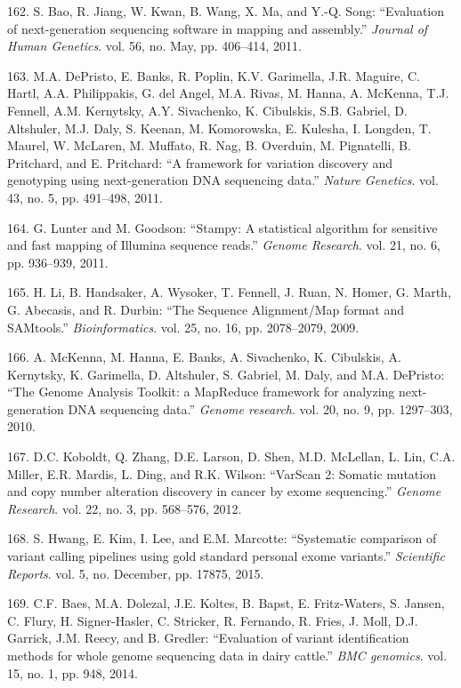 \documentclass[12pt,a4paper,twoside]{ugathesis}
\theoremstyle{definition}
\theoremstyle{definition}
\theoremstyle{definition}
\theoremstyle{remark}
\begin{document}
\hypertarget{ref-Bao2011}{}
162. S. Bao, R. Jiang, W. Kwan, B. Wang, X. Ma, and Y.-Q. Song:
``Evaluation of next-generation sequencing software in mapping and
assembly.'' \emph{Journal of Human Genetics}. vol. 56, no. May, pp.
406--414, 2011.

\hypertarget{ref-DePristo2011}{}
163. M.A. DePristo, E. Banks, R. Poplin, K.V. Garimella, J.R. Maguire,
C. Hartl, A.A. Philippakis, G. del Angel, M.A. Rivas, M. Hanna, A.
McKenna, T.J. Fennell, A.M. Kernytsky, A.Y. Sivachenko, K. Cibulskis,
S.B. Gabriel, D. Altshuler, M.J. Daly, S. Keenan, M. Komorowska, E.
Kulesha, I. Longden, T. Maurel, W. McLaren, M. Muffato, R. Nag, B.
Overduin, M. Pignatelli, B. Pritchard, and E. Pritchard: ``A framework
for variation discovery and genotyping using next-generation DNA
sequencing data.'' \emph{Nature Genetics}. vol. 43, no. 5, pp. 491--498,
2011.

\hypertarget{ref-Lunter2011}{}
164. G. Lunter and M. Goodson: ``Stampy: A statistical algorithm for
sensitive and fast mapping of Illumina sequence reads.'' \emph{Genome
Research}. vol. 21, no. 6, pp. 936--939, 2011.

\hypertarget{ref-Li2009}{}
165. H. Li, B. Handsaker, A. Wysoker, T. Fennell, J. Ruan, N. Homer, G.
Marth, G. Abecasis, and R. Durbin: ``The Sequence Alignment/Map format
and SAMtools.'' \emph{Bioinformatics}. vol. 25, no. 16, pp. 2078--2079,
2009.

\hypertarget{ref-McKenna2010}{}
166. A. McKenna, M. Hanna, E. Banks, A. Sivachenko, K. Cibulskis, A.
Kernytsky, K. Garimella, D. Altshuler, S. Gabriel, M. Daly, and M.A.
DePristo: ``The Genome Analysis Toolkit: a MapReduce framework for
analyzing next-generation DNA sequencing data.'' \emph{Genome research}.
vol. 20, no. 9, pp. 1297--303, 2010.

\hypertarget{ref-Koboldt2012}{}
167. D.C. Koboldt, Q. Zhang, D.E. Larson, D. Shen, M.D. McLellan, L.
Lin, C.A. Miller, E.R. Mardis, L. Ding, and R.K. Wilson: ``VarScan 2:
Somatic mutation and copy number alteration discovery in cancer by exome
sequencing.'' \emph{Genome Research}. vol. 22, no. 3, pp. 568--576,
2012.

\hypertarget{ref-Hwang2015}{}
168. S. Hwang, E. Kim, I. Lee, and E.M. Marcotte: ``Systematic
comparison of variant calling pipelines using gold standard personal
exome variants.'' \emph{Scientific Reports}. vol. 5, no. December, pp.
17875, 2015.

\hypertarget{ref-Baes2014}{}
169. C.F. Baes, M.A. Dolezal, J.E. Koltes, B. Bapst, E. Fritz-Waters, S.
Jansen, C. Flury, H. Signer-Hasler, C. Stricker, R. Fernando, R. Fries,
J. Moll, D.J. Garrick, J.M. Reecy, and B. Gredler: ``Evaluation of
variant identification methods for whole genome sequencing data in dairy
cattle.'' \emph{BMC genomics}. vol. 15, no. 1, pp. 948, 2014.
\end{document}
